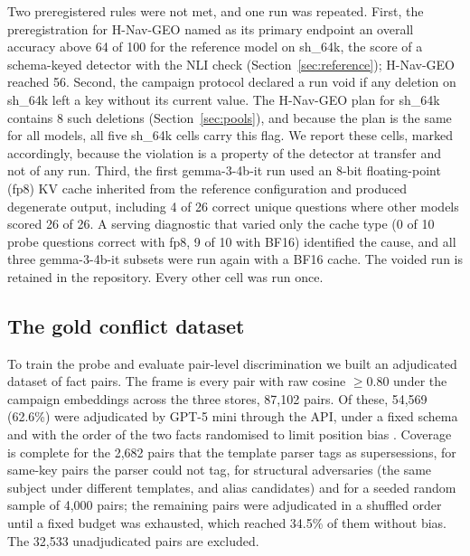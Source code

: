 \documentclass[journal=jcisd8,manuscript=article]{achemso}
\newcommand{\sub}[1]{\textsf{sh\_#1}}                    %
\newcommand{\geo}{H-Nav-GEO}
\begin{document}
Two preregistered rules were not met, and one run was repeated. First, the preregistration for \geo{} named as its primary endpoint an overall accuracy above 64 of 100 for the reference model on \sub{64k}, the score of a schema-keyed detector with the NLI check (Section~\ref{sec:reference}); \geo{} reached 56. Second, the campaign protocol declared a run void if any deletion on \sub{64k} left a key without its current value. The \geo{} plan for \sub{64k} contains 8 such deletions (Section~\ref{sec:pools}), and because the plan is the same for all models, all five \sub{64k} cells carry this flag. We report these cells, marked accordingly, because the violation is a property of the detector at transfer and not of any run. Third, the first gemma-3-4b-it run used an 8-bit floating-point (fp8) KV cache inherited from the reference configuration and produced degenerate output, including 4 of 26 correct unique questions where other models scored 26 of 26. A serving diagnostic that varied only the cache type (0 of 10 probe questions correct with fp8, 9 of 10 with BF16) identified the cause, and all three gemma-3-4b-it subsets were run again with a BF16 cache. The voided run is retained in the repository. Every other cell was run once.

\subsection{The gold conflict dataset}
\label{sec:gold}

To train the probe and evaluate pair-level discrimination we built an adjudicated dataset of fact pairs. The frame is every pair with raw cosine $\ge0.80$ under the campaign embeddings across the three stores, 87,102 pairs. Of these, 54,569 (62.6\%) were adjudicated by GPT-5 mini through the API, under a fixed schema and with the order of the two facts randomised to limit position bias \cite{wang2024fairevaluators,zheng2023judging}. Coverage is complete for the 2,682 pairs that the template parser tags as supersessions, for same-key pairs the parser could not tag, for structural adversaries (the same subject under different templates, and alias candidates) and for a seeded random sample of 4,000 pairs; the remaining pairs were adjudicated in a shuffled order until a fixed budget was exhausted, which reached 34.5\% of them without bias. The 32,533 unadjudicated pairs are excluded.
\end{document}
